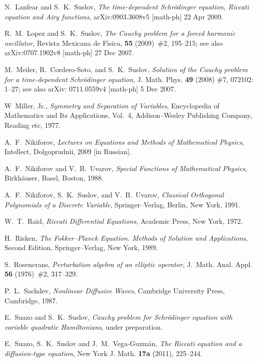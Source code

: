 \documentclass[12pt,reqno]{amsart}
\theoremstyle{plain}
\numberwithin{equation}{section}
\begin{document}
\begin{thebibliography}{99}
 N.~Lanfear and S.~K.~Suslov, \emph{The time-dependent Schr\"{o}dinger equation, Riccati equation and Airy functions\/},
arXiv:0903.3608v5 [math-ph] 22 Apr 2009.

 R.~M.~Lopez and S.~K.~Suslov, \emph{The Cauchy problem for
a forced harmonic oscillator\/}, Revista Mexicana de F\'{\i}sica, \textbf{55}
(2009)~\#2, 195--215; see also arXiv:0707.1902v8 [math-ph] 27 Dec 2007.

 M.~Meiler, R.~Cordero-Soto, and S.~K.~Suslov, \emph{Solution of the Cauchy problem for a time-dependent Schr\"{o}dinger
equation\/}, J. Math. Phys. \textbf{49} (2008) \#7, 072102: 1--27; see also
arXiv: 0711.0559v4 [math-ph] 5 Dec 2007.

 W~Miller, Jr., \textsl{Symmetry and Separation of
Variables\/}, Encyclopedia of Mathematics and Its Applications, Vol.~4,
Addison--Wesley Publishing Company, Reading etc, 1977.

 A.~F.~Nikiforov, \textsl{Lectures on Equations and Methods
of Mathematical Physics\/}, Intellect, Dolgoprudnii, 2009 [in Russian].

 A.~F.~Nikiforov and V.~B.~Uvarov, \textsl{Special Functions
of Mathematical Physics\/}, Birkh\"{a}user, Basel, Boston, 1988.

 A.~F.~Nikiforov, S.~K.~Suslov, and V.~B.~Uvarov, \textsl{Classical Orthogonal Polynomials of a Discrete Variable\/},
Springer--Verlag, Berlin, New York, 1991.

 W.~T.~Raid, \textsl{Riccati Differential Equations\/},
Academic Press, New York, 1972.

 H.~Risken, \textsl{The Fokker--Planck Equation. Methods
of Solution and Applications\/}, Second Edition, Springer--Verlag, New York,
1989.

 S.~Rosencrans, \emph{Perturbation algebra of an elliptic
operator\/}, J.~Math. Anal. Appl. \textbf{56} (1976)~\#2, 317--329.

 P.~L.~Sachdev, \textsl{Nonlinear Diffusive Waves\/},
Cambridge University Press, Cambridge, 1987.

 E.~Suazo and S.~K.~Suslov, \emph{Cauchy problem for Schr\"{o}dinger equation with variable quadratic Hamiltonians\/}, under
preparation.

 E.~Suazo, S.~K.~Suslov and J.~M.~Vega-Guzm\'{a}n, 
\emph{The Riccati equation and a diffusion-type equation\/}, New York J.
Math. \textbf{17a} (2011), 225--244.


\end{thebibliography}
\end{document}
